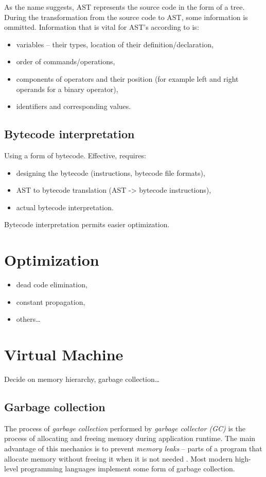 \documentclass[thesis=M,english]{FITthesis}[2019/12/23]
\begin{document}
As the name suggests, AST represents the source code in the form of a tree. During the transformation from the source code to AST, some information
is ommitted. Information that is vital for AST's according to \cite{deepsource-ast} is:
\begin{itemize}
	\item variables -- their types, location of their definition/declaration,
	\item order of commands/operations,
	\item components of operators and their position (for example left and right operands for a binary operator),
	\item identifiers and corresponding values.
\end{itemize}

\subsection{Bytecode interpretation}
Using a form of bytecode. Effective, requires:
\begin{itemize}
	\item designing the bytecode (instructions, bytecode file formats),
	\item AST to bytecode translation (AST -> bytecode instructions),
	\item actual bytecode interpretation.
\end{itemize}
Bytecode interpretation permits easier optimization.

\section{Optimization}
\begin{itemize}
	\item dead code elimination,
	\item constant propagation,
	\item others\ldots
\end{itemize}

\section{Virtual Machine}
Decide on memory hierarchy, garbage collection\ldots

\subsection{Garbage collection}
The process of \textit{garbage collection} performed by \textit{garbage collector (GC)} is the process of allocating and freeing
memory during application runtime. The main advantage of this mechanics is to prevent \textit{memory leaks} -- parts of a program
that allocate memory without freeing it when it is not needed \cite{memleaks-raygun}. Most modern high-level programming languages
implement some form of garbage collection.
\end{document}
